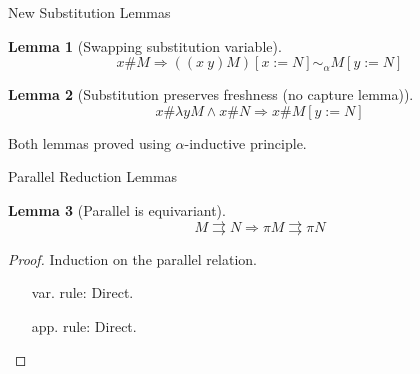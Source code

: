 \documentclass[ignorenonframetext]{beamer}
\newcommand{\alp}{\ensuremath{\alpha}}
\newcommand{\alpsym}{\ensuremath{\sim_\alpha}}
\newcommand{\p}{\ensuremath{\rightrightarrows}}
\newcommand{\lam}{\ensuremath{\lambda}}
\newtheorem{lem}{Lemma}
\begin{document}
\begin{frame}{New Substitution Lemmas}

\begin{lem}[Swapping substitution variable]
\label{pequiv}
\[ x \# M  \Rightarrow ((x\ y) M) [x:=N] \alpsym  M [y := N] \]
\end{lem}

\vspace{2mm}

\begin{lem}[Substitution preserves freshness (no capture lemma)]
\label{nocapture}
\[ x \# \lam y M   \wedge x \# N \Rightarrow x \# M [ y := N] \]
\end{lem}

\vspace{2mm}

Both lemmas proved using \alp-inductive principle.
\end{frame}

\begin{frame}{Parallel Reduction Lemmas}

\begin{lem}[Parallel is equivariant]
\label{pequiv}
\[ M \p N \Rightarrow \pi M \p \pi N \]
\end{lem}

\vspace{2mm}

\begin{proof}
Induction on the parallel relation.

\begin{itemize}
   \item[var. rule:] Direct.
   \item[app. rule:] Direct.
\end{itemize}
\end{proof}
\end{frame}
\end{document}
